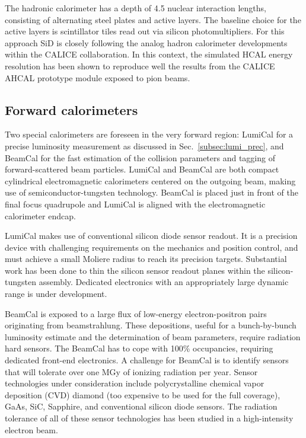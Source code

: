 The hadronic
calorimeter has a depth of 4.5 nuclear interaction lengths, consisting of
alternating steel plates and active layers. The baseline choice for the active
layers is scintillator tiles read out via silicon photomultipliers. For this approach SiD is closely following the analog hadron calorimeter developments within the CALICE collaboration. In this context, the simulated HCAL energy resolution has been shown to reproduce well the results from the CALICE AHCAL prototype module exposed to pion beams.

\subsection{Forward calorimeters}
\label{subsub:det:forward}
Two special calorimeters are foreseen in the very forward region: LumiCal for a precise luminosity measurement as discussed in Sec.~\ref{subsec:lumi_prec}, and BeamCal for the fast estimation of the collision parameters and tagging of forward-scattered beam particles. LumiCal and BeamCal are both compact cylindrical electromagnetic calorimeters centered on the outgoing beam, making use of semiconductor-tungsten technology. BeamCal is placed just in front of the final focus quadrupole and LumiCal is aligned with the electromagnetic calorimeter endcap. 

LumiCal makes use of conventional silicon diode sensor readout. It is a precision device with challenging requirements on the mechanics and position control, and must achieve a small Moliere radius to reach its precision targets. Substantial work has been done to thin the silicon sensor readout planes within the silicon-tungsten assembly. Dedicated electronics with an appropriately large dynamic range is under development.

BeamCal is exposed to a large flux of low-energy electron-positron pairs originating from beamstrahlung. These depositions, useful for a bunch-by-bunch luminosity estimate and the determination of beam parameters, require radiation hard sensors. The BeamCal has to cope with 100\% occupancies, requiring dedicated front-end electronics. A challenge for BeamCal is to identify sensors that will tolerate over one MGy of ionizing radiation per year. Sensor technologies under consideration include polycrystalline chemical vapor deposition (CVD) diamond (too expensive to be used for the full coverage), GaAs, SiC, Sapphire, and conventional silicon diode sensors. The radiation tolerance of all of these sensor technologies has been studied in a high-intensity electron beam. 

